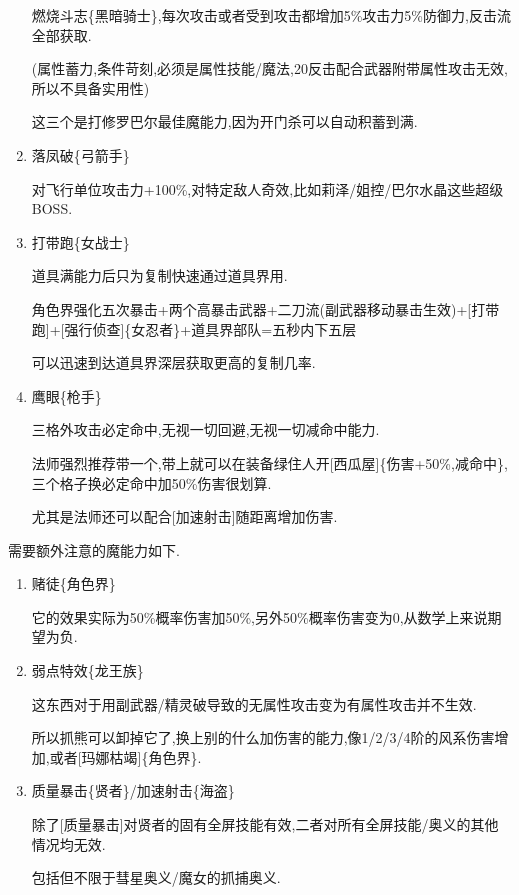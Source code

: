 \begin{enumerate}
		燃烧斗志\{黑暗骑士\},每次攻击或者受到攻击都增加5\%攻击力5\%防御力,反击流全部获取.

		(属性蓄力,条件苛刻,必须是属性技能/魔法,20反击配合武器附带属性攻击无效,所以不具备实用性)

		这三个是打修罗巴尔最佳魔能力,因为开门杀可以自动积蓄到满.

		\item
		落凤破\{弓箭手\}

		对飞行单位攻击力+100\%,对特定敌人奇效,比如莉泽/姐控/巴尔水晶这些超级BOSS.

		\item
		打带跑\{女战士\}

		道具满能力后只为复制快速通过道具界用.

		角色界强化五次暴击+两个高暴击武器+二刀流(副武器移动暴击生效)+[打带跑]+[强行侦查]\{女忍者\}+道具界部队=五秒内下五层

		可以迅速到达道具界深层获取更高的复制几率.

		\item
		鹰眼\{枪手\}

		三格外攻击必定命中,无视一切回避,无视一切减命中能力.

		法师强烈推荐带一个,带上就可以在装备绿住人开[西瓜屋]\{伤害+50\%,减命中\},三个格子换必定命中加50\%伤害很划算.

		尤其是法师还可以配合[加速射击]随距离增加伤害.



	\end{enumerate}

	需要额外注意的魔能力如下.

	\begin{enumerate}



		\item
		赌徒\{角色界\}

		它的效果实际为50\%概率伤害加50\%,另外50\%概率伤害变为0,从数学上来说期望为负.

		\item
		弱点特效\{龙王族\}

		这东西对于用副武器/精灵破导致的无属性攻击变为有属性攻击并不生效.

		所以抓熊可以卸掉它了,换上别的什么加伤害的能力,像1/2/3/4阶的风系伤害增加,或者[玛娜枯竭]\{角色界\}.

		\item
		质量暴击\{贤者\}/加速射击\{海盗\}

		除了[质量暴击]对贤者的固有全屏技能有效,二者对所有全屏技能/奥义的其他情况均无效.

		包括但不限于彗星奥义/魔女的抓捕奥义.

	\end{enumerate}
	


